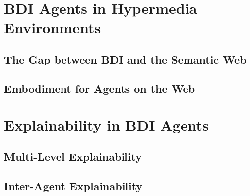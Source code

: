 \section{BDI Agents in Hypermedia Environments}

\subsection{The Gap between BDI and the Semantic Web}

\subsection{Embodiment for Agents on the Web}


\section{Explainability in \acs{BDI} Agents}

\subsection{Multi-Level Explainability}


\subsection{Inter-Agent Explainability}
